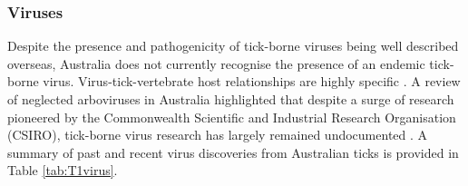 \documentclass[a4paper, nobind]{templates/ociamthesis}
\begin{document}
\hypertarget{viruses-1}{%
\subsubsection{Viruses}\label{viruses-1}}

Despite the presence and pathogenicity of tick-borne viruses being well described overseas, Australia does not currently recognise the presence of an endemic tick-borne virus.
Virus-tick-vertebrate host relationships are highly specific \autocite{labudaTickborneViruses2004}.
A review of neglected arboviruses in Australia highlighted that despite a surge of research pioneered by the Commonwealth Scientific and Industrial Research Organisation (CSIRO), tick-borne virus research has largely remained undocumented \autocite{gyawaliNeglectedAustralianArboviruses2017}.
A summary of past and recent virus discoveries from Australian ticks is provided in Table \ref{tab:T1virus}.
\end{document}
